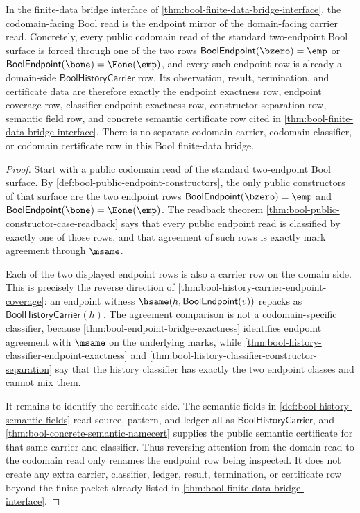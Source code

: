 \begin{lemma}
\label{lem:bool-finite-data-domain-codomain-mirror-boundary}
In the finite-data bridge interface of \autoref{thm:bool-finite-data-bridge-interface}, the codomain-facing Bool read is the endpoint mirror of the domain-facing carrier read. Concretely, every public codomain read of the standard two-endpoint Bool surface is forced through one of the two rows
$\mathsf{BoolEndpoint}(\bzero)=\emp$ or $\mathsf{BoolEndpoint}(\bone)=\Eone(\emp)$, and every such endpoint row is already a domain-side $\mathsf{BoolHistoryCarrier}$ row. Its observation, result, termination, and certificate data are therefore exactly the endpoint exactness row, endpoint coverage row, classifier endpoint exactness row, constructor separation row, semantic field row, and concrete semantic certificate row cited in \autoref{thm:bool-finite-data-bridge-interface}. There is no separate codomain carrier, codomain classifier, or codomain certificate row in this Bool finite-data bridge.
\end{lemma}
\begin{proof}
Start with a public codomain read of the standard two-endpoint Bool surface. By \autoref{def:bool-public-endpoint-constructors}, the only public constructors of that surface are the two endpoint rows $\mathsf{BoolEndpoint}(\bzero)=\emp$ and $\mathsf{BoolEndpoint}(\bone)=\Eone(\emp)$. The readback theorem \autoref{thm:bool-public-constructor-case-readback} says that every public endpoint read is classified by exactly one of those rows, and that agreement of such rows is exactly mark agreement through $\msame$.

Each of the two displayed endpoint rows is also a carrier row on the domain side. This is precisely the reverse direction of \autoref{thm:bool-history-carrier-endpoint-coverage}: an endpoint witness $\hsame(h,\mathsf{BoolEndpoint}(v))$ repacks as $\mathsf{BoolHistoryCarrier}(h)$. The agreement comparison is not a codomain-specific classifier, because \autoref{thm:bool-endpoint-bridge-exactness} identifies endpoint agreement with $\msame$ on the underlying marks, while \autoref{thm:bool-history-classifier-endpoint-exactness} and \autoref{thm:bool-history-classifier-constructor-separation} say that the history classifier has exactly the two endpoint classes and cannot mix them.

It remains to identify the certificate side. The semantic fields in \autoref{def:bool-history-semantic-fields} read source, pattern, and ledger all as $\mathsf{BoolHistoryCarrier}$, and \autoref{thm:bool-concrete-semantic-namecert} supplies the public semantic certificate for that same carrier and classifier. Thus reversing attention from the domain read to the codomain read only renames the endpoint row being inspected. It does not create any extra carrier, classifier, ledger, result, termination, or certificate row beyond the finite packet already listed in \autoref{thm:bool-finite-data-bridge-interface}.
\end{proof}

